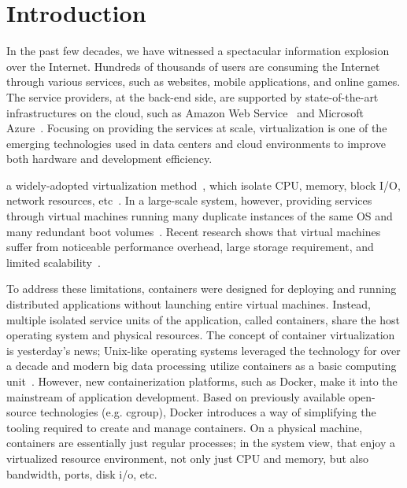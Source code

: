 \section{Introduction}
In the past few decades, we have witnessed a spectacular information explosion over the Internet.
Hundreds of thousands of users are consuming  the Internet through various services, such as websites, mobile applications, and online games.
The service providers, at the back-end side, are supported by state-of-the-art infrastructures on the cloud, such as Amazon Web Service~\cite{aws} and
Microsoft Azure~\cite{azure}. 
Focusing on providing the services at scale, 
virtualization is one of the emerging  technologies used in data centers and cloud environments to 
improve both hardware and development efficiency.

 a widely-adopted virtualization method~\cite{vm}, which isolate CPU, memory, 
block I/O, network resources, etc~\cite{jithin2014virtual}.
In a large-scale system, however,
providing services through virtual machines 
running many duplicate instances of the same OS and  many redundant boot volumes~\cite{medina2014survey}. 
Recent research shows that virtual machines suffer from noticeable performance overhead, large storage requirement, and 
limited scalability~\cite{xu2014managing}. 

To address these limitations, containers were designed for deploying
and running distributed applications without launching entire virtual machines. 
Instead, multiple isolated service units of the application, 
called containers, share the host operating system and physical resources.
The concept of container virtualization is yesterday's news;
Unix-like operating systems leveraged the technology for over a decade  and modern 
big data processing  utilize containers as a basic computing unit~\cite{wang2014fresh, wang2015omo, wang2017seina}. 
However, new containerization platforms, such as Docker, make it into the mainstream of application development.
Based on previously available open-source technologies 
(e.g. cgroup), Docker introduces a way of simplifying the tooling required to create and manage containers.
On a physical machine, containers are essentially just regular processes; in the system view,  that enjoy a virtualized resource environment, not only just CPU and
memory, but also bandwidth, ports, disk i/o, etc. 

